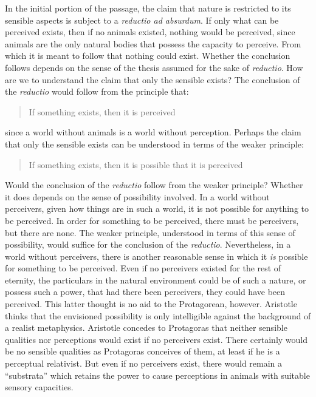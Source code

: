 In the initial portion of the passage, the claim that nature is restricted to its sensible aspects is subject to a \emph{reductio ad absurdum}. If only what can be perceived exists, then if no animals existed, nothing would be perceived, since animals are the only natural bodies that possess the capacity to perceive. From which it is meant to follow that nothing could exist. Whether the conclusion follows depends on the sense of the thesis assumed for the sake of \emph{reductio}. How are we to understand the claim that only the sensible exists? The conclusion of the \emph{reductio} would follow from the principle that:
\begin{quote}
	If something exists, then it is perceived
\end{quote}
since a world without animals is a world without perception. Perhaps the claim that only the sensible exists can be understood in terms of the weaker principle:
\begin{quote}
	If something exists, then it is possible that it is perceived 
\end{quote}
Would the conclusion of the \emph{reductio} follow from the weaker principle? Whether it does depends on the sense of possibility involved. In a world without perceivers, given how things are in such a world, it is not possible for anything to be perceived. In order for something to be perceived, there must be perceivers, but there are none. The weaker principle, understood in terms of this sense of possibility, would suffice for the conclusion of the \emph{reductio}. Nevertheless, in a world without perceivers, there is another reasonable sense in which it \emph{is} possible for something to be perceived. Even if no perceivers existed for the rest of eternity, the particulars in the natural environment could be of such a nature, or possess such a power, that had there been perceivers, they could have been perceived. This latter thought is no aid to the Protagorean, however. Aristotle thinks that the envisioned possibility is only intelligible against the background of a realist metaphysics. Aristotle concedes to Protagoras that neither sensible qualities nor perceptions would exist if no perceivers exist. There certainly would be no sensible qualities as Protagoras conceives of them, at least if he is a perceptual relativist. But even if no perceivers exist, there would remain a ``substrata'' which retains the power to cause perceptions in animals with suitable sensory capacities. 

